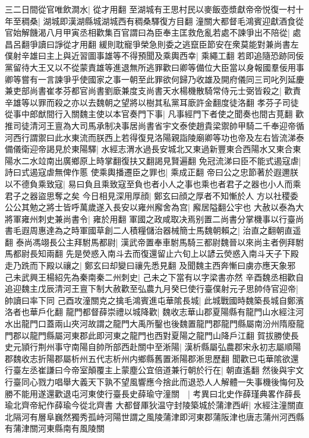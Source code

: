 三二日間從官唯飲澗水|{
	從才用翻}
至湖城有王思村民以麥飯壺漿獻帝帝悦復一村十年至稠桑|{
	湖城即漢湖縣城湖城西有稠桑驛復方目翻}
潼關大都督毛鴻賓迎獻酒食從官始解饑渴八月甲寅丞相歡集百官謂曰為臣奉主匡救危亂若處不諫爭出不陪從|{
	處昌呂翻爭讀曰諍從才用翻}
緩則耽寵爭榮急則委之逃竄臣節安在衆莫能對兼尚書左僕射辛雄曰主上與近習圖事雄等不得預聞及乘輿西幸|{
	乘繩工翻}
若即追隨恐跡同佞黨留待大王又以不從蒙責雄等進退無所逃罪歡曰卿等備位大臣當以身報國羣佞用事卿等嘗有一言諫爭乎使國家之事一朝至此罪欲何歸乃收雄及開府儀同三司叱列延慶兼吏部尚書崔孝芬都官尚書劉廞兼度支尚書天水楊機散騎常侍元士弼皆殺之|{
	歡責辛雄等以罪而殺之亦以去魏朝之望將以樹其私黨耳廞許金翻度徒洛翻}
孝芬子司徒從事中郎猷間行入關魏主使以本官奏門下事|{
	凡事經門下者使之聞奏也間古莧翻}
歡推司徒清河王亶為大司馬承制决事居尚書省宇文泰使趙貴梁禦帥甲騎二千奉迎帝循河西行謂禦曰此水東流而朕西上若得復見洛陽親詣陵廟卿等功也帝及左右皆流涕泰備儀衛迎帝謁見於東陽驛|{
	水經志渭水過長安城北又東過新豐東合西陽水又東合東陽水二水竝南出廣鄉原上時掌翻復扶又翻謁見賢遍翻}
免冠流涕曰臣不能式遏寇虐|{
	詩曰式遏寇虐無俾作慝}
使乘輿播遷臣之罪也|{
	乘成正翻}
帝曰公之忠節著於遐邇朕以不德負乘致寇|{
	易曰負且乘致寇至負也者小人之事也乘也者君子之器也小人而乘君子之器盜思奪之矣}
今日相見深用厚顔|{
	鄭玄曰顔之厚者不知慚於人}
方以社稷委公公其勉之將士皆呼萬歲遂入長安以雍州廨舍為宫|{
	廨居隘翻公宇也}
大赦以泰為大將軍雍州刺史兼尚書令|{
	雍於用翻}
軍國之政咸取决焉别置二尚書分掌機事以行臺尚書毛遐周惠達為之時軍國草創二人積糧儲治器械簡士馬魏朝賴之|{
	治直之翻朝直遥翻}
泰尚馮翊長公主拜駙馬都尉|{
	漢武帝置奉車駙馬騎三都尉魏晉以來尚主者例拜駙馬都尉長知兩翻}
先是熒惑入南斗去而復還留止六旬上以諺云熒惑入南斗天子下殿走乃跣而下殿以禳之|{
	鄭玄曰却變曰禳先悉見翻}
及聞魏主西奔慚曰虜亦應天象邪　己未武興王楊紹先為秦南秦二州刺史|{
	己未之下當有以字梁書亦然}
辛酉魏丞相歡自追迎魏主戊辰清河王亶下制大赦歡至弘農九月癸巳使行臺僕射元子思帥侍官迎帝|{
	帥讀曰率下同}
己酉攻潼關克之擒毛鴻賓進屯華隂長城|{
	此城戰國時魏築長城自鄭濱洛者也華戶化翻}
龍門都督薛崇禮以城降歡|{
	魏收志華山郡夏陽縣有龍門山水經注河水出龍門口蓋兩山夾河故謂之龍門大禹所鑿也後魏置龍門郡龍門縣屬南汾州隋廢龍門郡以龍門縣屬河東郡此即河東之龍門也西對夏陽之龍門山降戶江翻}
賀拔勝使長史元頴行荆州事守南陽自帥所部西赴關中至淅陽|{
	漢析縣屬弘農郡宋永初志屬順陽郡魏收志折陽郡屬析州五代志析州内鄉縣舊置淅陽郡淅思歷翻}
聞歡已屯華隂欲還行臺左丞崔謙曰今帝室顛覆主上蒙塵公宜倍道兼行朝於行在|{
	朝直遙翻}
然後與宇文行臺同心戮力唱舉大義天下孰不望風響應今捨此而退恐人人解體一失事機後悔何及勝不能用遂還歡退屯河東使行臺長史薛瑜守潼關　|{
	考異曰北史作薛瑾典畧作薛長瑜北齊帝紀作薛瑜今從北齊書}
大都督厙狄温守封陵築城於蒲津西㟁|{
	水經注潼關直北隔河有層阜巍然獨秀孤峙河陽世謂之風陵蒲津即河東郡蒲阪津也唐志蒲州河西縣有蒲津關河東縣南有風陵關}
